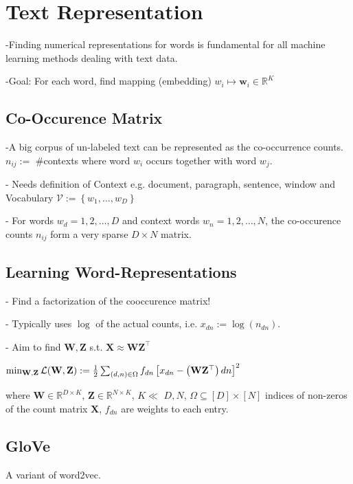 \section*{Text Representation}

-Finding numerical representations for words is fundamental for all machine learning methods dealing with text data.

-Goal: For each word, find mapping (embedding) $w_{i} \mapsto \mathbf{w}_{i} \in \mathbb{R}^{K}$

\subsection*{Co-Occurence Matrix}

-A big corpus of un-labeled text can be represented as the co-occurrence counts. $n_{i j}:=$ \#contexts where word $w_{i}$ occurs together with word $w_{j}$.

- Needs definition of Context e.g. document, paragraph, sentence, window and Vocabulary $\mathcal{V}:=\left\{w_{1}, \ldots, w_{D}\right\}$

- For words $w_{d}=1,2, \ldots, D$ and context words $w_{n}=1,2, \ldots, N$, the co-occurence counts $n_{i j}$ form a very sparse $D \times N$ matrix.

\subsection*{Learning Word-Representations}

- Find a factorization of the cooccurence matrix!

- Typically uses $\log$ of the actual counts, i.e. $x_{d n}:=\log \left(n_{d n}\right)$.

- Aim to find $\mathbf{W}, \mathbf{Z}$ s.t. $
\mathbf{X} \approx \mathbf{W} \mathbf{Z}^{\top}
$

$
\min _{\mathbf{W}, \mathbf{Z}} \mathcal{L}(\mathbf{W}, \mathbf{Z}):=\\\frac{1}{2} \sum_{(d, n) \in \Omega} f_{d n}\left[x_{d n}-\left(\mathbf{W} \mathbf{Z}^{\top}\right) d n\right]^{2}
$

where $\mathbf{W} \in \mathbb{R}^{D \times K}$, $\mathbf{Z} \in \mathbb{R}^{N \times K}$, $K \ll$ $D, N$, $\Omega \subseteq[D] \times[N]$ indices of non-zeros of the count matrix $\mathbf{X}$, $f_{d n}$ are weights to each entry.

\subsection*{GloVe}
A variant of word2vec.

